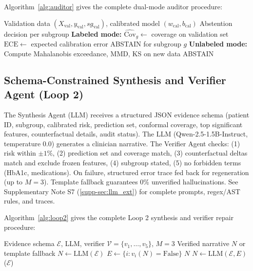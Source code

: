 \documentclass[11pt,a4paper]{article}
\theoremstyle{plain}
\begin{document}
Algorithm~\ref{alg:auditor} gives the complete dual-mode auditor procedure:

\begin{algorithm}[htbp]
\caption{Dual-Mode Deployment Auditor}
\label{alg:auditor}
\begin{algorithmic}[1]
\Require Validation data $(X_{\text{val}}, y_{\text{val}}, sg_{\text{val}})$, calibrated model $(w_{\text{cal}}, b_{\text{cal}})$
\Ensure Abstention decision per subgroup
\State \textbf{Labeled mode:}
  \State $\widehat{\mathrm{Cov}}_g \gets$ coverage on validation set
  \State $\mathrm{ECE} \gets$ expected calibration error
    \State ABSTAIN for subgroup $g$
  \EndIf
\EndFor
\State \textbf{Unlabeled mode:}
\State Compute Mahalanobis exceedance, MMD, KS on new data
  \State ABSTAIN
\EndIf
\end{algorithmic}
\end{algorithm}

\subsection{Schema-Constrained Synthesis and Verifier Agent (Loop 2)}
\label{sec:synthesis}

The Synthesis Agent (LLM) receives a structured JSON evidence schema (patient ID, subgroup, calibrated risk, prediction set, conformal coverage, top significant features, counterfactual details, audit status). The LLM (Qwen-2.5-1.5B-Instruct, temperature 0.0) generates a clinician narrative. The Verifier Agent checks: (1) risk within $\pm 1\%$, (2) prediction set and coverage match, (3) counterfactual deltas match and exclude frozen features, (4) subgroup stated, (5) no forbidden terms (HbA1c, medications). On failure, structured error trace fed back for regeneration (up to $M=3$). Template fallback guarantees 0\% unverified hallucinations. See Supplementary Note S7 (\ref{supp-sec:llm_ext}) for complete prompts, regex/AST rules, and traces.

Algorithm~\ref{alg:loop2} gives the complete Loop 2 synthesis and verifier repair procedure:

\begin{algorithm}[htbp]
\caption{Loop 2 -- Schema-Grounded Synthesis and Verifier Repair}
\label{alg:loop2}
\begin{algorithmic}[1]
\Require Evidence schema $\mathcal E$, LLM, verifier $\mathcal V=\{v_1,\dots,v_5\}$, $M=3$
\Ensure Verified narrative $N$ or template fallback
\State $N \gets \text{LLM}(\mathcal E)$
  \State $E \gets \{i : v_i(N)=\text{False}\}$
    \State \Return $N$ 
  \EndIf
  \State $N \gets \text{LLM}(\mathcal E, E)$ 
\EndFor
    \State \Return {}($\mathcal E$) 
\end{algorithmic}
\end{algorithm}
\end{document}
